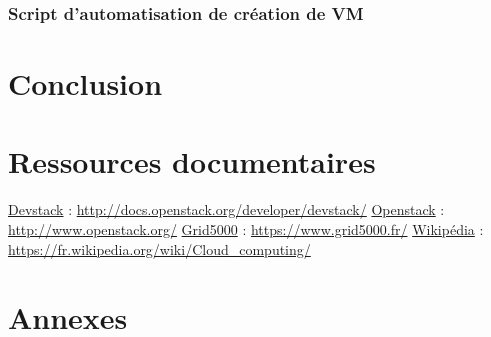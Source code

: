 \documentclass{report}
\begin{document}
        \subsection{Script d'automatisation de création de VM}
            



\newpage
\chapter*{Conclusion}


\newpage
\chapter*{Ressources documentaires}
\href{http://docs.openstack.org/developer/devstack/}{Devstack} :
\url{http://docs.openstack.org/developer/devstack/}
\bigbreak
\href{http://www.openstack.org/}{Openstack} :
\url{http://www.openstack.org/}
\bigbreak
\href{https://www.grid5000.fr/}{Grid5000} :
\url{https://www.grid5000.fr/}
\bigbreak
\href{https://fr.wikipedia.org/wiki/Cloud_computing/}{Wikipédia} :
\url{https://fr.wikipedia.org/wiki/Cloud_computing/}



\newpage
\chapter*{Annexes}
\end{document}
